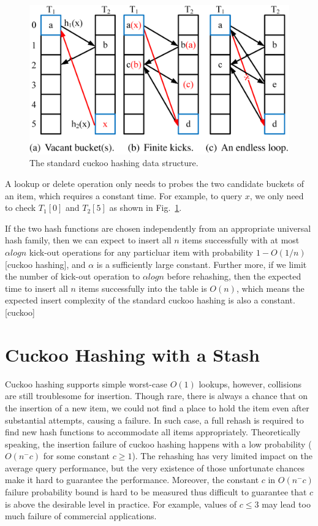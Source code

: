 \documentclass[12pt,conference,compsoc]{IEEEtran}
\begin{document}
\begin{figure}
    \centering
    \includegraphics[width=\linewidth]{fig1.png}
    \caption{The standard cuckoo hashing data structure.
    } \label{fig:cuckoo-example}
\end{figure}

A lookup or delete operation only needs to probes the two candidate buckets of an item, which requires a constant time. For example, to query $x$, we only need to check $T_1[0]$ and $T_2[5]$ as shown in Fig.~\ref{fig:cuckoo-example}.

If the two hash functions are chosen independently from an appropriate universal hash family, then we can expect to insert all $n$ items successfully with at most $\alpha logn$ kick-out operations for any particluar item with probability $1-O(1/n)$[cuckoo hashing], and $\alpha$ is a sufficiently large constant. Further more, if we limit the number of kick-out operation to $\alpha logn$ before rehashing, then the expected time to insert all $n$ items successfully into the table is $O(n)$, which means the expected insert complexity of the standard cuckoo hashing is also a constant.[cuckoo]

\section{Cuckoo Hashing with a Stash}
\label{sec:chs}
Cuckoo hashing supports simple worst-case $O(1)$ lookups, however, collisions are still troublesome for insertion. Though rare, there is always a chance that on the insertion of a new item, we could not find a place to hold the item even after substantial attempts, causing a failure. In such case, a full rehash is required to find new hash functions to accommodate all items appropriately. Theoretically speaking, the insertion failure of cuckoo hashing happens with a low probability ($O(n^-c)$ for some constant $c\geq 1$). The rehashing has very limited impact on the average query performance, but the very existence of those unfortunate chances make it hard to guarantee the performance. Moreover, the constant $c$ in $O(n^-c)$ failure probability bound is hard to be measured thus difficult to guarantee that $c$ is above the desirable level in practice. For example, values of $c\leq3$ may lead too much failure of commercial applications.
\end{document}
